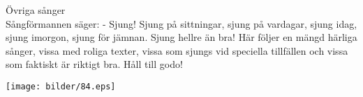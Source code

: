 \begin{flushleft}
{\Huge Övriga sånger\\}
\vspace{1cm}
{\Large
Sångförmannen säger:
- Sjung! Sjung på sittningar, sjung på vardagar, sjung idag, sjung
imorgon, sjung för jämnan. Sjung hellre än bra! Här följer en mängd härliga sånger, vissa
med roliga texter, vissa som sjungs vid speciella tillfällen och vissa
som faktiskt är riktigt bra. Håll till godo! 
}
\end{flushleft}

\begin{center}
\vspace{2cm}
\texttt{[image: bilder/84.eps]}
\end{center}

\newpage


\newpage


\newpage
{}

\newpage





\newpage



\newpage



\newpage


\newpage


\newpage



\newpage

\newpage




\newpage

